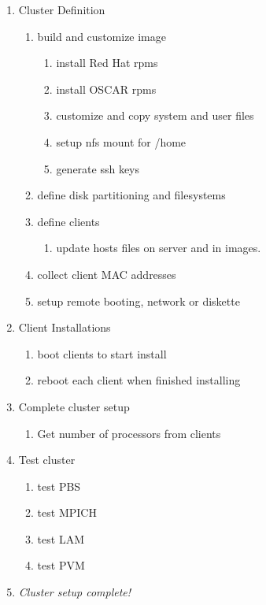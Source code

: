 \begin{enumerate}
        \item Cluster Definition
        \begin{enumerate}
                \item build and customize image
                \begin{enumerate}
                        \item install Red Hat rpms
                        \item install OSCAR rpms
                        \item customize and copy system and user files
                        \item setup nfs mount for /home
                        \item generate ssh keys
                \end{enumerate}
                \item define disk partitioning and filesystems
                \item define clients
                \begin{enumerate}
                        \item update hosts files on server and in images.
                \end{enumerate}
                \item collect client MAC addresses
                \item setup remote booting, network or diskette
        \end{enumerate}

        \item Client Installations
        \begin{enumerate}
                \item boot clients to start install
                \item reboot each client when finished installing
        \end{enumerate}
        \item Complete cluster setup
        \begin{enumerate}
                \item Get number of processors from clients
        \end{enumerate}
        \item Test cluster
        \begin{enumerate}
                \item test PBS
                \item test MPICH
                \item test LAM
                \item test PVM
        \end{enumerate}
        \item \emph{Cluster setup complete!}
\end{enumerate}

